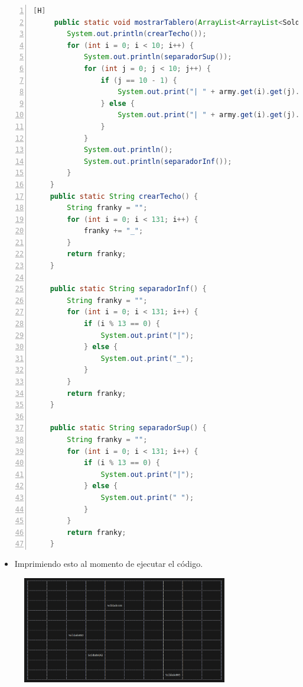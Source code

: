 \documentclass{article}
\begin{document}
	\begin{lstlisting}[language=java,caption={Mostrar el tablero}, numbers=left][H]
	 public static void mostrarTablero(ArrayList<ArrayList<Soldado>> army) {
        System.out.println(crearTecho());
        for (int i = 0; i < 10; i++) {
            System.out.println(separadorSup());
            for (int j = 0; j < 10; j++) {
                if (j == 10 - 1) {
                    System.out.print("| " + army.get(i).get(j).getNombre() + " |");
                } else {
                    System.out.print("| " + army.get(i).get(j).getNombre() + " ");
                }
            }
            System.out.println();
            System.out.println(separadorInf());
        }
    }
    public static String crearTecho() {
        String franky = "";
        for (int i = 0; i < 131; i++) {
            franky += "_";
        }
        return franky;
    }

    public static String separadorInf() {
        String franky = "";
        for (int i = 0; i < 131; i++) {
            if (i % 13 == 0) {
                System.out.print("|");
            } else {
                System.out.print("_");
            }
        }
        return franky;
    }

    public static String separadorSup() {
        String franky = "";
        for (int i = 0; i < 131; i++) {
            if (i % 13 == 0) {
                System.out.print("|");
            } else {
                System.out.print(" ");
            }
        }
        return franky;
    }
	\end{lstlisting}
	
	\begin{itemize}
		\item Imprimiendo esto al momento de ejecutar el código.
	\end{itemize}
	
	\begin{figure}[H]
		\centering
	\includegraphics[width=0.8\textwidth,keepaspectratio]{img/captura1.png}
	\end{figure}
	
\end{document}
